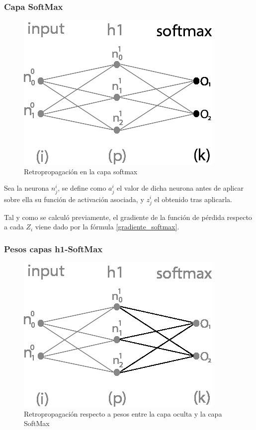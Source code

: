 \subsubsection{Capa SoftMax}

\begin{figure}[H]
	\centering
	\includegraphics[scale=0.35]{imagenes/nn_1_capa_output.jpg}  
	\caption{Retropropagación en la capa softmax}
	\label{fig:nn_1_capa_output}
\end{figure}

Sea la neurona $n^i_j$, se define como $a^i_j$ el valor de dicha neurona antes de aplicar sobre ella su función de activación asociada, y $z^i_j$ el obtenido tras aplicarla. 

Tal y como se calculó previamente, el gradiente de la función de pérdida respecto a cada $Z_i$ viene dado por la fórmula \ref{gradiente_softmax}.


\subsubsection{Pesos capas h1-SoftMax}

\begin{figure}[H]
	\centering
	\includegraphics[scale=0.35]{imagenes/nn_1_capa_pesos_h1_output.jpg}  
	\caption{Retropropagación respecto a pesos entre la capa oculta y la capa SoftMax}
	\label{fig:nn_1_pesos_h1_output}
\end{figure}

